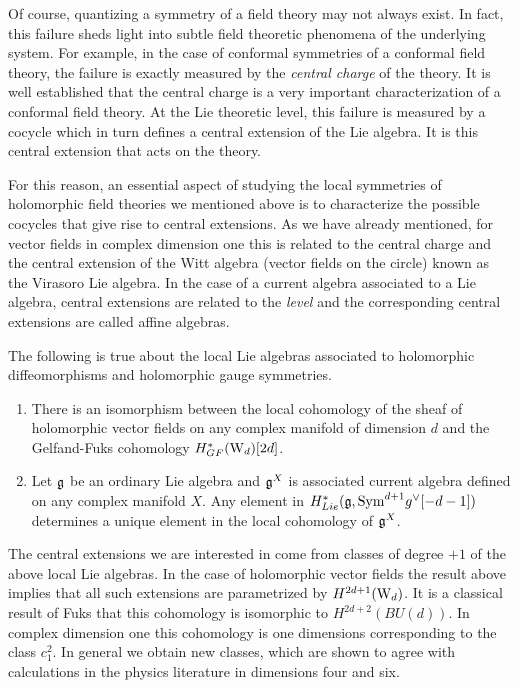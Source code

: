 \documentclass[10pt]{amsart}
\begin{document}
Of course, quantizing a symmetry of a field theory may not always exist.
In fact, this failure sheds light into subtle field theoretic phenomena of the underlying system. 
For example, in the case of conformal symmetries of a conformal field theory, the failure is exactly measured by the {\em central charge} of the theory. 
It is well established that the central charge is a very important characterization of a conformal field theory.
At the Lie theoretic level, this failure is measured by a cocycle which in turn defines a central extension of the Lie algebra. 
It is this central extension that acts on the theory. 

For this reason, an essential aspect of studying the local symmetries of holomorphic field theories we mentioned above is to characterize the possible cocycles that give rise to central extensions. 
As we have already mentioned, for vector fields in complex dimension one this is related to the central charge and the central extension of the Witt algebra (vector fields on the circle) known as the Virasoro Lie algebra.
In the case of a current algebra associated to a Lie algebra, central extensions are related to the {\em level} and the corresponding central extensions are called affine algebras. 

\begin{thm}
The following is true about the local Lie algebras associated to holomorphic diffeomorphisms and holomorphic gauge symmetries.
\begin{enumerate}
\item There is an isomorphism between the local cohomology of the sheaf of holomorphic vector fields on any complex manifold of dimension $d$ and the Gelfand-Fuks cohomology $H^*_{GF}({\rm W}_d)[2d]$. 
\item Let $\mathfrak g$ be an ordinary Lie algebra and $\mathfrak g^X$ is associated current algebra defined on any complex manifold $X$. 
Any element in $H^*_{Lie}(\mathfrak g , {\rm Sym}^{d+1} g^\vee [-d-1])$ determines a unique 
element in the local cohomology of $\mathfrak g^X$.
\end{enumerate}
\end{thm}

The central extensions we are interested in come from classes of degree $+1$ of the above local Lie algebras.
In the case of holomorphic vector fields the result above implies that all such extensions are parametrized by $H^{2d+1}({\rm W}_d)$. 
It is a classical result of Fuks \cite{Fuks} that this cohomology is isomorphic to $H^{2d+2}(BU(d))$. 
In complex dimension one this cohomology is one dimensions corresponding to the class $c_1^2$. 
In general we obtain new classes, which are shown to agree with calculations in the physics 
literature in dimensions four and six. 
\end{document}

